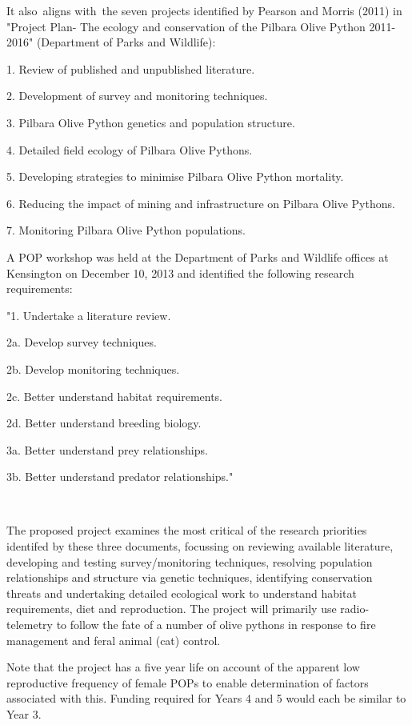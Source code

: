 \documentclass[version=last,
    paper=a4,                               %
    10pt,                                   %
    dvipsnames,
    oneside,                              %
    headings=openany,                       %
    open=any,
    BCOR=7mm,                               %
    DIV=15,     %
]{scrbook}
\begin{document}
It also~aligns with~the seven projects identified by Pearson and Morris
(2011) in "Project Plan- The ecology and conservation of the Pilbara
Olive Python 2011-2016" (Department of Parks and Wildlife):

1. Review of published and unpublished literature.

2. Development of survey and monitoring techniques.

3. Pilbara Olive Python genetics and population structure.

4. Detailed field ecology of Pilbara Olive Pythons.

5. Developing strategies to minimise Pilbara Olive Python mortality.

6. Reducing the impact of mining and infrastructure on Pilbara Olive
Pythons.

7. Monitoring Pilbara Olive Python populations.

A POP workshop was held at the Department of Parks and Wildlife offices
at Kensington on December 10, 2013 and identified the following research
requirements:

"1. Undertake a literature review.

2a. Develop survey techniques.

2b. Develop monitoring techniques.

2c. Better understand habitat requirements.

2d. Better understand breeding biology.

3a. Better understand prey relationships.

3b. Better understand predator relationships."

~

The proposed project examines the most critical of the research
priorities identifed by these three documents, focussing on reviewing
available literature, developing and testing survey/monitoring
techniques, resolving population relationships and structure via genetic
techniques, identifying conservation threats and undertaking detailed
ecological work to understand habitat requirements, diet and
reproduction. The project will primarily use radio-telemetry to follow
the fate of a number of olive pythons in response to fire management and
feral animal (cat) control.

Note that the project has a five year life on account of the apparent
low reproductive frequency of female POPs to enable determination of
factors associated with this. Funding required for Years 4 and 5 would
each be similar to Year 3.
\end{document}
